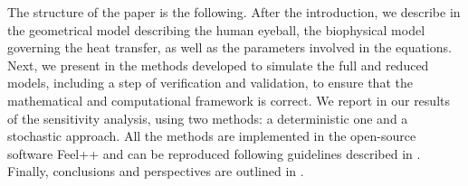 The structure of the paper is the following.
After the introduction, we describe in  the geometrical model describing the human eyeball,
the biophysical model governing the heat transfer, as well as the parameters involved in the equations.
Next, we present in  the methods developed to simulate the full and reduced models, including a step of verification and validation,
to ensure that the mathematical and computational framework is correct.
We report in  our results of the sensitivity analysis, using two methods: a deterministic one and a stochastic approach.
All the methods are implemented in the open-source software Feel++ \cite{christophe_prud_homme_2023_8272196} and can be reproduced following guidelines described in .
Finally, conclusions and perspectives are outlined in .
